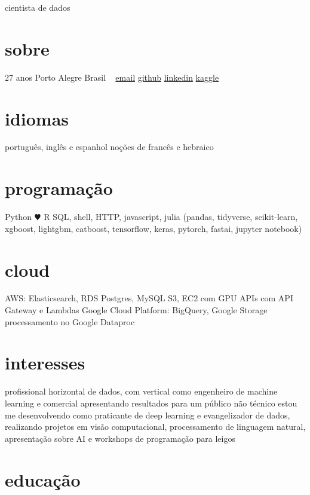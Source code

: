 \documentclass[]{friggeri-cv}
\begin{document}
       {cientista de dados}


\begin{aside}
  \section{sobre}
    27 anos
    Porto Alegre
    Brasil
    ~
    \href{mailto:jt\_anchante@hotmail.com}{email}
    \href{https://github.com/jayme-anchante/}{github}
    \href{https://www.linkedin.com/in/jayme-anchante}{linkedin}
    \href{https://www.kaggle.com/jaymeanchante}{kaggle}
  \section{idiomas}
    português, inglês e espanhol
    noções de francês e hebraico
  \section{programação}
    Python {\color{red} $\varheartsuit$} R
    SQL, shell, HTTP,
    javascript, julia
    (pandas, tidyverse,
    scikit-learn, xgboost,
    lightgbm, catboost,
    tensorflow, keras,
    pytorch, fastai,
    jupyter notebook)
  \section{cloud}
    AWS:
    Elasticsearch, RDS Postgres, MySQL
    S3, EC2 com GPU
    APIs com API Gateway e Lambdas
    Google Cloud Platform:
    BigQuery, Google Storage
    processamento no Google Dataproc
\end{aside}

\section{interesses}

profissional horizontal de dados, com vertical como engenheiro de machine learning
e comercial apresentando resultados para um público não técnico
estou me desenvolvendo como praticante de deep learning e evangelizador de dados,
realizando projetos em visão computacional, processamento de linguagem natural,
apresentação sobre AI e workshops de programação para leigos

\section{educação}
\end{document}
